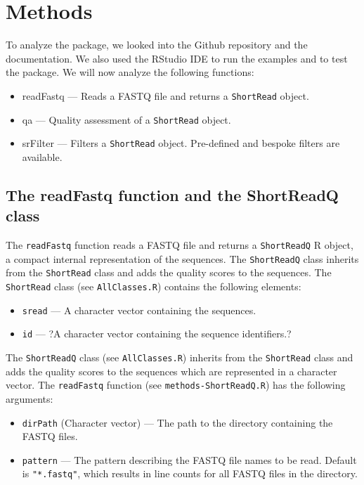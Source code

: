 \documentclass[12pt]{article}
\begin{document}
\section{Methods}
To analyze the package, we looked into the Github repository\cite{shortreadsgit} and the documentation\cite{shortreadsdoc}.
We also used the RStudio IDE to run the examples and to test the package.
We will now analyze the following functions:
\begin{itemize}
    \item readFastq — Reads a FASTQ file and returns a \texttt{ShortRead} object.
    \item qa — Quality assessment of a \texttt{ShortRead} object.
    \item srFilter — Filters a \texttt{ShortRead} object. Pre-defined and bespoke filters are available.  
\end{itemize}


\subsection{The readFastq function and the ShortReadQ class}
The \texttt{readFastq} function reads a FASTQ file and returns a \texttt{ShortReadQ} R object,
a compact internal representation of the sequences. The \texttt{ShortReadQ} class inherits from the \texttt{ShortRead} class and adds the quality scores to the sequences.
The \texttt{ShortRead} class (see \texttt{AllClasses.R}) contains the following elements:
\begin{itemize}
    \item \texttt{sread} — A character vector containing the sequences.
    \item \texttt{id} — ?A character vector containing the sequence identifiers.?
\end{itemize}

The \texttt{ShortReadQ} class (see \texttt{AllClasses.R}) inherits from the \texttt{ShortRead} class and adds the quality scores to the sequences which are represented in a character vector.
The \texttt{readFastq} function (see \texttt{methods-ShortReadQ.R}) has the following arguments:
\begin{itemize}
    \item \texttt{dirPath} (Character vector) — The path to the directory containing the FASTQ files.
    \item \texttt{pattern} — The pattern describing the FASTQ file names to be read. Default is \texttt{"*.fastq"}, which results in line counts for all FASTQ files in the directory.
\end{itemize}
\end{document}
